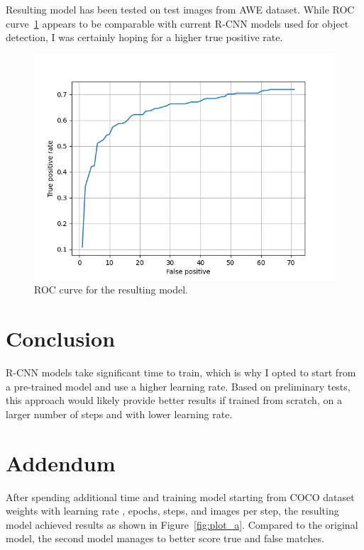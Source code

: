 \documentclass[9pt]{IEEEtran}
\begin{document}
Resulting model has been tested on test images from AWE dataset. While ROC curve~\ref{fig:plot1} appears to be comparable with current R-CNN models used for object detection, I was certainly hoping for a higher true positive rate.

\begin{figure}[h]
    \centering
    \includegraphics[width=1\columnwidth]{plot.png}
    \caption{ROC curve for the resulting model.}
    \label{fig:plot1}
\end{figure}

\section{Conclusion}

R-CNN models take significant time to train, which is why I opted to start from a pre-trained model and use a higher learning rate. Based on preliminary tests, this approach would likely provide better results if trained from scratch, on a larger number of steps and with lower learning rate.

\section{Addendum}

After spending additional time and training model starting from COCO dataset weights with learning rate ,  epochs,  steps, and  images per step, the resulting model achieved results as shown in Figure~\ref{fig:plot_a}. Compared to the original model, the second model manages to better score true and false matches.
\end{document}
